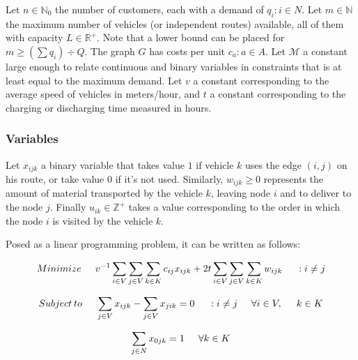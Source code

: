 \documentclass{amsart}
\begin{document}
        
        Let $n \in \mathbb{N}_0$ the number of customers, each with a demand of $q_i : i \in N$. Let $m \in \mathbb{N}$ the maximum number of vehicles (or independent routes) available, all of them with capacity $L \in \mathbb{R}^+$. Note that a lower bound can be placed for $m \geq (\sum q_i) \div Q$. The graph $G$ has costs per unit $c_{a} : a \in A$. Let $\mathcal{M}$ a constant large enough to relate continuous and binary variables in constraints that is at least equal to the maximum demand. Let $v$ a constant corresponding to the average speed of vehicles in meters/hour, and $t$ a constant corresponding to the charging or discharging time measured in hours.


        \subsubsection{Variables}
        
        
        Let $x_{ijk}$ a binary variable that takes value $1$ if vehicle $k$ uses the edge $(i, j)$ on his route, or take value $0$ if it's not used. Similarly, $w_{ijk} \geq 0$ represents the amount of material transported by the vehicle $k$, leaving node $i$ and to deliver to the node $j$. Finally $u_{ik} \in \mathbb{Z}^+$ takes a value corresponding to the order in which the node $i$ is visited by the vehicle $k$.

        
        \vspace{0.4cm} Posed as a linear programming problem, it can be written as follows:
            
            \begin{equation}
                Minimize \hspace{0.5cm} v^{-1} \sum_{i \in V} \sum_{j \in V} \sum_{k \in K} c_{ij} x_{ijk} + 2t \sum_{i \in V} \sum_{j \in V} \sum_{k \in K} w_{ijk} \hspace{0.5cm} : i \neq j
            \end{equation}

        $$Subject\hspace{0.07cm} to \hspace{0.5cm} \sum_{j \in V} x_{ijk} - \sum_{j \in V} x_{jik} = 0 \hspace{0.5cm} : i \neq j \hspace{0.5cm} \forall i \in V, \hspace{0.5cm} k \in K$$

        $$\sum_{j \in N} x_{0jk} = 1 \hspace{0.5cm} \forall k \in K$$
\end{document}
